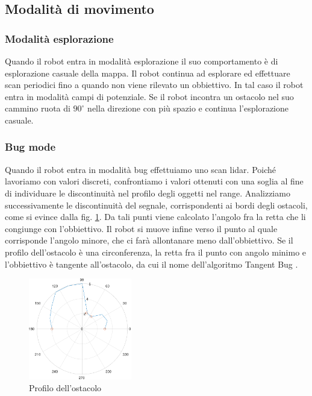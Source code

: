 \documentclass[a4paper]{article}
\begin{document}
	\subsection{Modalità di movimento}\label{subsec:Modalità-di-movimento}
	
	\subsubsection{Modalità esplorazione}\label{subsec:Modalita-esplorazione}
	Quando il robot entra in modalità esplorazione il suo comportamento è di
	esplorazione casuale della mappa. Il robot continua ad esplorare ed
	effettuare scan periodici fino a quando non viene rilevato un obbiettivo.
	In tal caso il robot entra in modalità campi di potenziale. Se il robot
	incontra un ostacolo nel suo cammino ruota di $90^{\circ}$ nella direzione
	con più spazio e continua l'esplorazione casuale.
	
	\subsubsection{Bug mode}\label{subsec:Bug-mode}
	Quando il robot entra in modalità bug effettuiamo uno scan lidar. Poiché
	lavoriamo con valori discreti, confrontiamo i valori ottenuti con una
	soglia al fine di individuare le discontinuità nel profilo degli oggetti
	nel range. Analizziamo successivamente le discontinuità del segnale,
	corrispondenti ai bordi degli ostacoli, come si evince dalla fig.
	\ref{fig:bug}. Da tali punti viene calcolato l'angolo fra la retta che li
	congiunge con l'obbiettivo. Il robot si muove infine verso il punto al
	quale corrisponde l'angolo minore, che ci farà allontanare meno
	dall'obbiettivo. Se il profilo dell'ostacolo è una circonferenza, la retta
	fra il punto con angolo minimo e l'obbiettivo è tangente all'ostacolo, da
	cui il nome dell'algoritmo Tangent Bug \cite{503814}.
	
	\begin{figure}[H]
		\centering
		\includegraphics[width=0.4\textwidth]{./img/bug.pdf}
		\caption{Profilo dell'ostacolo}
		\label{fig:bug}
	\end{figure}
\end{document}

